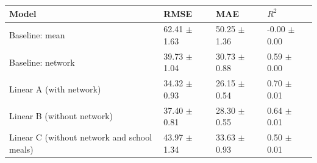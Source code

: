 \begin{tabular}{llll}
\toprule
Model & RMSE & MAE & $R^2$ \\
\midrule
Baseline: mean & 62.41 $\pm$ 1.63 & 50.25 $\pm$ 1.36 & -0.00 $\pm$ 0.00 \\
Baseline: network & 39.73 $\pm$ 1.04 & 30.73 $\pm$ 0.88 & 0.59 $\pm$ 0.00 \\
Linear A (with network) & 34.32 $\pm$ 0.93 & 26.15 $\pm$ 0.54 & 0.70 $\pm$ 0.01 \\
Linear B (without network) & 37.40 $\pm$ 0.81 & 28.30 $\pm$ 0.55 & 0.64 $\pm$ 0.01 \\
Linear C (without network and school meals) & 43.97 $\pm$ 1.34 & 33.63 $\pm$ 0.93 & 0.50 $\pm$ 0.01 \\
\bottomrule
\end{tabular}
